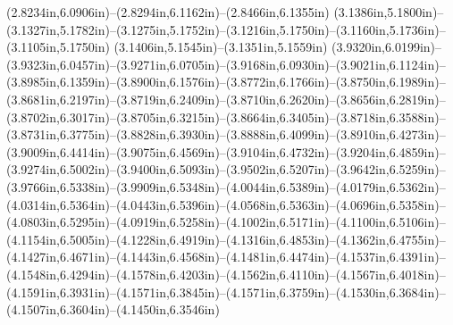 (2.8234in,6.0906in)--(2.8294in,6.1162in)--(2.8466in,6.1355in) (3.1386in,5.1800in)--(3.1327in,5.1782in)--(3.1275in,5.1752in)--(3.1216in,5.1750in)--(3.1160in,5.1736in)--(3.1105in,5.1750in) (3.1406in,5.1545in)--(3.1351in,5.1559in) (3.9320in,6.0199in)--(3.9323in,6.0457in)--(3.9271in,6.0705in)--(3.9168in,6.0930in)--(3.9021in,6.1124in)--(3.8985in,6.1359in)--(3.8900in,6.1576in)--(3.8772in,6.1766in)--(3.8750in,6.1989in)--(3.8681in,6.2197in)--(3.8719in,6.2409in)--(3.8710in,6.2620in)--(3.8656in,6.2819in)--(3.8702in,6.3017in)--(3.8705in,6.3215in)--(3.8664in,6.3405in)--(3.8718in,6.3588in)--(3.8731in,6.3775in)--(3.8828in,6.3930in)--(3.8888in,6.4099in)--(3.8910in,6.4273in)--(3.9009in,6.4414in)--(3.9075in,6.4569in)--(3.9104in,6.4732in)--(3.9204in,6.4859in)--(3.9274in,6.5002in)--(3.9400in,6.5093in)--(3.9502in,6.5207in)--(3.9642in,6.5259in)--(3.9766in,6.5338in)--(3.9909in,6.5348in)--(4.0044in,6.5389in)--(4.0179in,6.5362in)--(4.0314in,6.5364in)--(4.0443in,6.5396in)--(4.0568in,6.5363in)--(4.0696in,6.5358in)--(4.0803in,6.5295in)--(4.0919in,6.5258in)--(4.1002in,6.5171in)--(4.1100in,6.5106in)--(4.1154in,6.5005in)--(4.1228in,6.4919in)--(4.1316in,6.4853in)--(4.1362in,6.4755in)--(4.1427in,6.4671in)--(4.1443in,6.4568in)--(4.1481in,6.4474in)--(4.1537in,6.4391in)--(4.1548in,6.4294in)--(4.1578in,6.4203in)--(4.1562in,6.4110in)--(4.1567in,6.4018in)--(4.1591in,6.3931in)--(4.1571in,6.3845in)--(4.1571in,6.3759in)--(4.1530in,6.3684in)--(4.1507in,6.3604in)--(4.1450in,6.3546in)
